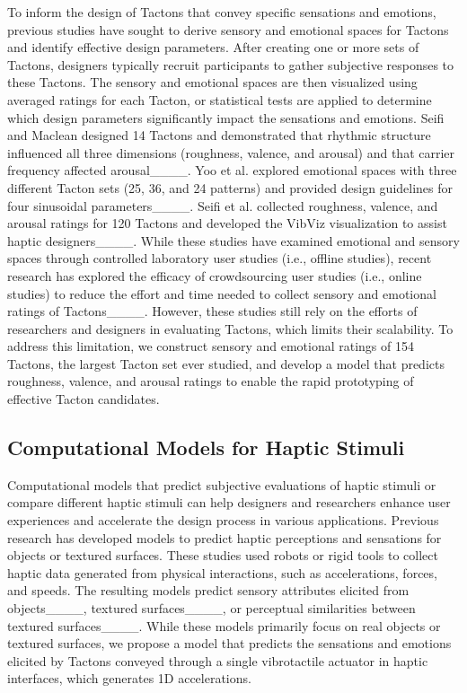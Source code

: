 To inform the design of Tactons that convey specific sensations and emotions, previous studies have sought to derive sensory and emotional spaces for Tactons and identify effective design parameters.
After creating one or more sets of Tactons, designers typically recruit participants to gather subjective responses to these Tactons.
The sensory and emotional spaces are then visualized using averaged ratings for each Tacton, or statistical tests are applied to determine which design parameters significantly impact the sensations and emotions.
Seifi and Maclean designed 14 Tactons and demonstrated that rhythmic structure influenced all three dimensions (roughness, valence, and arousal) and that carrier frequency affected arousal____.
Yoo et al. explored emotional spaces with three different Tacton sets (25, 36, and 24 patterns) and provided design guidelines for four sinusoidal parameters____.
Seifi et al. collected roughness, valence, and arousal ratings for 120 Tactons and developed the VibViz visualization to assist haptic designers____.
While these studies have examined emotional and sensory spaces through controlled laboratory user studies (i.e., offline studies), recent research has explored the efficacy of crowdsourcing user studies (i.e., online studies) to reduce the effort and time needed to collect sensory and emotional ratings of Tactons____. 
However, these studies still rely on the efforts of researchers and designers in evaluating Tactons, which limits their scalability.
To address this limitation, we construct sensory and emotional ratings of 154 Tactons, the largest Tacton set ever studied, and develop a model that predicts roughness, valence, and arousal ratings to enable the rapid prototyping of effective Tacton candidates.


\subsection{Computational Models for Haptic Stimuli}

Computational models that predict subjective evaluations of haptic stimuli or compare different haptic stimuli can help designers and researchers enhance user experiences and accelerate the design process in various applications. 
Previous research has developed models to predict haptic perceptions and sensations for objects or textured surfaces.
These studies used robots or rigid tools to collect haptic data generated from physical interactions, such as accelerations, forces, and speeds.
The resulting models predict sensory attributes elicited from objects____, textured surfaces____, or perceptual similarities between textured surfaces____.
While these models primarily focus on real objects or textured surfaces, we propose a model that predicts the sensations and emotions elicited by Tactons conveyed through a single vibrotactile actuator in haptic interfaces, which generates 1D accelerations.


